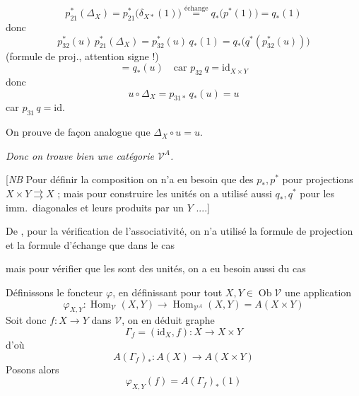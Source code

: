 \documentclass[11pt,a4paper]{article}
\begin{document}
\[
p_{21}^{*}(\Delta_{X}) = p_{21}^{*}\bigl( \delta_{X*}(1) \bigr) \stackrel{\text{échange}}{=} q_{*}\bigl( p^{*}(1) \bigr) = q_{*}(1)
\]
donc
\[
p_{32}^{*}(u)\, p_{21}^{*}(\Delta_{X}) = p_{32}^{*}(u)\, q_{*}(1) = q_{*}\bigl( q^{*}( p_{32}^{*}(u) ) \bigr)
\]
(formule de proj., attention signe !)
\[ = q_{*}(u) \quad \text{car } p_{32}\, q = \mathrm{id}_{X \times Y} \]
donc
\[ u \circ \Delta_{X} = p_{31*}\, q_{*}(u) = u \]
car  $p_{31}\, q = \mathrm{id}$.


On prouve de façon analogue que $\Delta_{X} \circ u = u$.

\emph{Donc on trouve bien une catégorie $\mathcal{V}^{A}$.}

[\emph{NB} Pour définir la composition on n'a eu besoin que des $p_{*}, p^{*}$
pour projections $X \times Y \rightrightarrows X$ ; mais pour
 construire les unités on a utilisé aussi $q_{*}, q^{*}$ pour
les imm.\ diagonales et leurs produits par un $Y$ ....]


De , pour la  vérification de l'associativité,
on n'a utilisé la formule de projection et la formule d'échange que dans le cas



mais pour vérifier que les  sont des unités, on a eu
besoin aussi du cas


Définissons le foncteur $\varphi$, en définissant pour tout
$X, Y \in \operatorname{Ob} \mathcal{V}$ une application
\[
\varphi_{X,Y} \colon \operatorname{Hom}_{\mathcal{V}}(X,Y) \longrightarrow \operatorname{Hom}_{\mathcal{V}^{A}}(X,Y) = A(X \times Y)
\]
Soit donc $f \colon X \to Y$ dans $\mathcal{V}$, on en déduit \ill{} graphe
\[ \Gamma_{f} = (\mathrm{id}_{X}, f) \colon X \to X \times Y \]
d'où
\[ A(\Gamma_{f})_{*} \colon A(X) \to A(X \times Y) \]
Posons alors \struck{\ill{}}
\[ \varphi_{X,Y}(f) = A(\Gamma_{f})_{*}(1) \]
\end{document}
